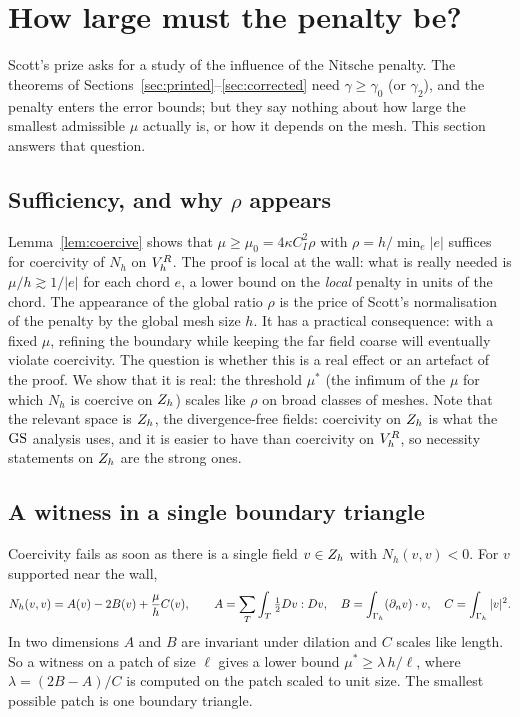 \section{How large must the penalty be?}\label{sec:penalty}

Scott's prize asks for a study of the influence of the Nitsche penalty. The theorems of Sections~\ref{sec:printed}--\ref{sec:corrected} need $\gamma\ge\gamma_0$ (or $\gamma_2$), and the penalty enters the error bounds; but they say nothing about how large the smallest admissible $\mu$ actually is, or how it depends on the mesh. This section answers that question.

\subsection{Sufficiency, and why $\rho$ appears}
Lemma~\ref{lem:coercive} shows that $\mu\ge\mu_0=4\kappa C_I^2\rho$ with $\rho=h/\min_e|e|$ suffices for coercivity of $N_h$ on $V_h^R$. The proof is local at the wall: what is really needed is $\mu/h\gtrsim1/|e|$ for each chord $e$, a lower bound on the \emph{local} penalty in units of the chord. The appearance of the global ratio $\rho$ is the price of Scott's normalisation of the penalty by the global mesh size $h$. It has a practical consequence: with a fixed $\mu$, refining the boundary while keeping the far field coarse will eventually violate coercivity. The question is whether this is a real effect or an artefact of the proof. We show that it is real: the threshold $\mu^\ast$ (the infimum of the $\mu$ for which $N_h$ is coercive on $Z_h$) scales like $\rho$ on broad classes of meshes. Note that the relevant space is $Z_h$, the divergence-free fields: coercivity on $Z_h$ is what the $\mathrm{GS}$ analysis uses, and it is easier to have than coercivity on $V_h^R$, so necessity statements on $Z_h$ are the strong ones.

\subsection{A witness in a single boundary triangle}
Coercivity fails as soon as there is a single field $v\in Z_h$ with $N_h(v,v)<0$. For $v$ supported near the wall,
\[
N_h(v,v)=A(v)-2B(v)+\frac\mu h C(v),\qquad A=\sum_T\int_T\tfrac12Dv:Dv,\quad B=\int_{\Gamma_h}(\partial_n v)\cdot v,\quad C=\int_{\Gamma_h}|v|^2 .
\]
In two dimensions $A$ and $B$ are invariant under dilation and $C$ scales like length. So a witness on a patch of size $\ell$ gives a lower bound $\mu^\ast\ge\lambda\,h/\ell$, where $\lambda=(2B-A)/C$ is computed on the patch scaled to unit size. The smallest possible patch is one boundary triangle.

